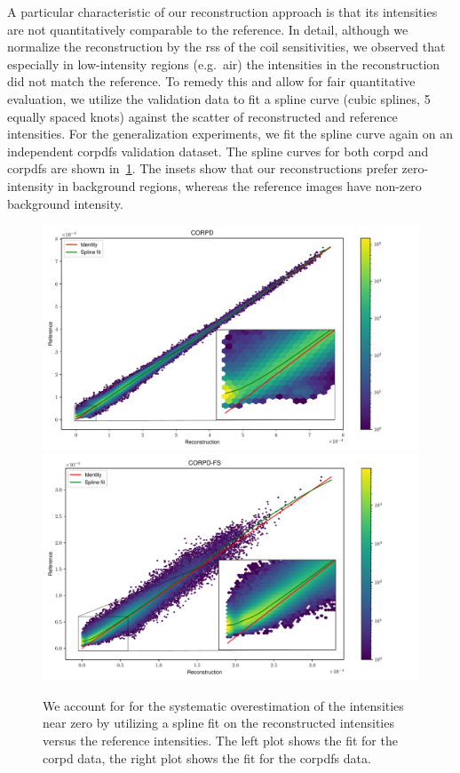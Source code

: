 A particular characteristic of our reconstruction approach is that its intensities are not quantitatively comparable to the reference.
In detail, although we normalize the reconstruction by the \gls{rss} of the coil sensitivities, we observed that especially in low-intensity regions (e.g.\ air) the intensities in the reconstruction did not match the reference.
To remedy this and allow for fair quantitative evaluation, we utilize the validation data to fit a spline curve (cubic splines, \num{5} equally spaced knots) against the scatter of reconstructed and reference intensities.
For the generalization experiments, we fit the spline curve again on an independent \gls{corpdfs} validation dataset.
The spline curves for both \gls{corpd} and \gls{corpdfs} are shown in~\cref{fig:splines}.
The insets show that our reconstructions prefer zero-intensity in background regions, whereas the reference images have non-zero background intensity.
\begin{figure}
	\includegraphics[width=.45\linewidth]{spline/spline}
	\includegraphics[width=.45\linewidth]{spline/spline-fs}
	\caption[Spline fit on the reconstructed versus the reference intensities]{%
		We account for for the systematic overestimation of the intensities near zero by utilizing a spline fit on the reconstructed intensities versus the reference intensities.
		The left plot shows the fit for the \gls{corpd} data, the right plot shows the fit for the \gls{corpdfs} data.
	}%
	\label{fig:splines}
\end{figure}

